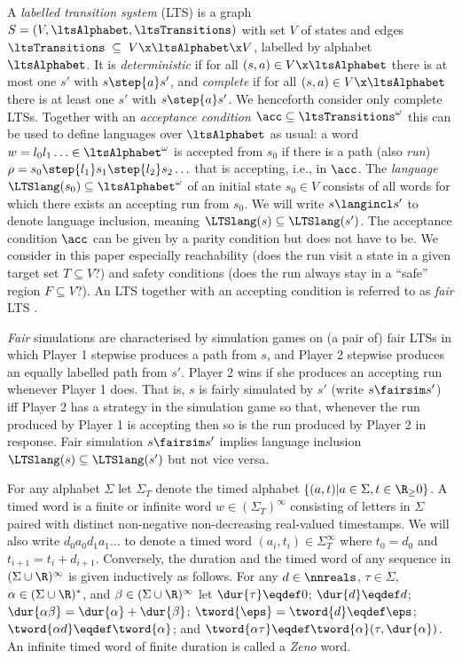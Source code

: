 \medskip
{}
A \emph{labelled transition system} (LTS)
is a graph 
$S=(V,\ltsAlphabet,\ltsTransitions)$
with set $V$ of states %
and edges $\ltsTransitions\;\subseteq\; V \x \ltsAlphabet \x V$, 
labelled by alphabet $\ltsAlphabet$.
It is \emph{deterministic} if for all $(s,a)\in V\x\ltsAlphabet$ there is at most one $s'$ with $s\step{a}s'$,
and \emph{complete} if for all $(s,a)\in V\x\ltsAlphabet$ there is at least one $s'$ with $s\step{a}s'$.
We henceforth consider only complete LTSs.
Together with an \emph{acceptance condition}
$\acc\subseteq \ltsTransitions^\omega$ this can be used to define languages over $\ltsAlphabet$ as usual:
a word $w=l_0l_1\ldots\in\ltsAlphabet^\omega$ is accepted from $s_0$ if
there is a path (also \emph{run})
$\rho=
s_0
\step{l_1}
s_1
\step{l_2}
s_2
\ldots
$
that is accepting, i.e., in $\acc$.
The \emph{language} $\LTSlang(s_0)\subseteq \ltsAlphabet^\omega$ of an initial state $s_0\in V$ 
consists of all words for which there exists an accepting run from $s_0$.
We will write $s\langincl s'$ to denote language inclusion, meaning $\LTSlang(s)\subseteq \LTSlang(s')$.
The acceptance condition $\acc$ can be given by a parity condition 
but does not have to be.
We consider in this paper especially reachability (does the run visit a state in a given target set $T\subseteq V$?)
and safety conditions (does the run always stay in a ``safe'' region $F\subseteq V$?).
An LTS together with an accepting condition is referred to as \emph{fair} LTS \cite{HKR1997}.


\emph{Fair} simulations 
\cite{HKR1997}
are characterised by simulation games on (a pair of) fair LTSs in which  Player 1 stepwise produces a path from $s$, and Player 2 stepwise produces an equally labelled path from $s'$. Player 2 wins if she produces an accepting run
whenever Player 1 does.
That is, $s$ is fairly simulated by $s'$ (write $s\fairsim s'$) iff Player 2 has a strategy in the simulation game
so that, whenever the run produced by Player 1 is accepting then so is the run produced by Player 2 in response.
Fair simulation $s\fairsim s'$ implies language inclusion $\LTSlang(s)\subseteq \LTSlang(s')$ but not vice versa.

\medskip
{}
For any alphabet $\Sigma$ let $\Sigma_T$ denote the timed alphabet $\{(a,t)|a\in \Sigma, t\in \R_\ge0\}$. 
A timed word is a finite or infinite word $w\in (\Sigma_T)^\infty$ consisting of letters in $\Sigma$ paired with distinct non-negative non-decreasing real-valued timestamps. %
We will also write $d_0a_0d_1a_1...$ to denote a timed word $(a_i,t_i)\in\Sigma_T^\infty$ where $t_0=d_0$ and $t_{i+1}=t_i+d_{i+1}$.
Conversely, the duration and the timed word
of any sequence in $(\Sigma\cup\R)^\infty$
is given inductively as follows.
For any
$d\in\nnreals$,
${\tau\in\Sigma}$,
$\alpha\in(\Sigma\cup\R)^*$,
and
$\beta\in(\Sigma\cup\R)^\infty$
let
$\dur{\tau}\eqdef 0$;
$\dur{d}\eqdef d$;
$\dur{\alpha\beta}=\dur{\alpha}+\dur{\beta}$;
$\tword{{\eps}}=\tword{d}\eqdef\eps$;
$\tword{{\alpha d}}\eqdef\tword{\alpha}$; and %
$\tword{{\alpha \tau}}\eqdef\tword{\alpha}(\tau,\dur{\alpha})$.
An infinite timed word of finite duration is called a \emph{Zeno} word. 

